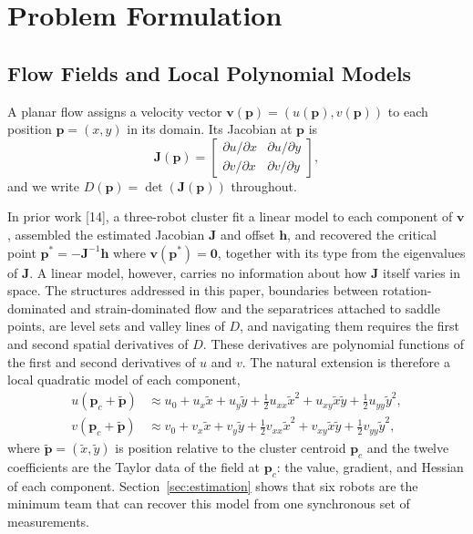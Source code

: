 \documentclass[lettersize,journal]{IEEEtran}
\begin{document}
\section{Problem Formulation}
\label{sec:detj_field}

\subsection{Flow Fields and Local Polynomial Models}

A planar flow assigns a velocity vector $\mathbf{v}(\mathbf{p}) =
(u(\mathbf{p}), v(\mathbf{p}))$ to each position $\mathbf{p} = (x, y)$ in its
domain. Its Jacobian at $\mathbf{p}$ is
\begin{equation}
    \mathbf{J}(\mathbf{p}) =
    \begin{bmatrix}
        \partial u / \partial x & \partial u / \partial y \\
        \partial v / \partial x & \partial v / \partial y
    \end{bmatrix},
    \label{eq:jacobian}
\end{equation}
and we write $D(\mathbf{p}) = \det(\mathbf{J}(\mathbf{p}))$ throughout.

In prior work [14], a three-robot cluster fit a linear model to each
component of $\mathbf{v}$, assembled the estimated Jacobian
$\mathbf{J}$ and offset $\mathbf{h}$, and recovered the critical point
$\mathbf{p}^* = -\mathbf{J}^{-1}\mathbf{h}$ where $\mathbf{v}(\mathbf{p}^*) =
\mathbf{0}$, together with its type from the eigenvalues of $\mathbf{J}$.
A linear model, however, carries no information about how $\mathbf{J}$
itself varies in space. The structures addressed in this paper, boundaries
between rotation-dominated and strain-dominated flow and the separatrices
attached to saddle points, are level sets and valley lines of $D$, and
navigating them requires the first and second spatial derivatives of $D$.
These derivatives are polynomial functions of the first and second
derivatives of $u$ and $v$. The natural extension is therefore a local
quadratic model of each component,
\begin{align}
    u(\mathbf{p}_c + \tilde{\mathbf{p}}) &\approx u_0 + u_x \tilde{x}
        + u_y \tilde{y} + \tfrac{1}{2} u_{xx} \tilde{x}^2
        + u_{xy} \tilde{x}\tilde{y} + \tfrac{1}{2} u_{yy} \tilde{y}^2,
        \label{eq:quad_model_u} \\
    v(\mathbf{p}_c + \tilde{\mathbf{p}}) &\approx v_0 + v_x \tilde{x}
        + v_y \tilde{y} + \tfrac{1}{2} v_{xx} \tilde{x}^2
        + v_{xy} \tilde{x}\tilde{y} + \tfrac{1}{2} v_{yy} \tilde{y}^2,
        \label{eq:quad_model_v}
\end{align}
where $\tilde{\mathbf{p}} = (\tilde{x}, \tilde{y})$ is position relative to
the cluster centroid $\mathbf{p}_c$ and the twelve coefficients are the
Taylor data of the field at $\mathbf{p}_c$: the value, gradient, and
Hessian of each component. Section~\ref{sec:estimation} shows that six
robots are the minimum team that can recover this model from one
synchronous set of measurements.
\end{document}
